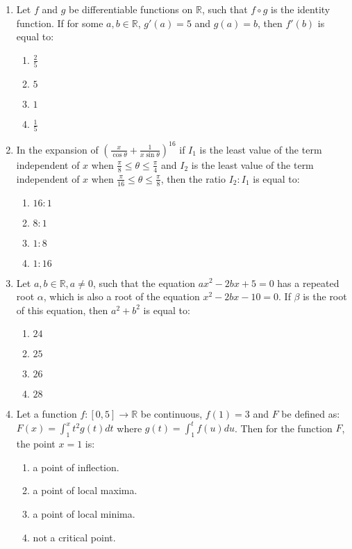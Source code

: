 \documentclass[journal]{IEEEtran}
\begin{document}
\begin{enumerate}
    \item Let $ f $ and $ g $ be differentiable functions on $ \mathbb{R} $, such that $ f \circ g $ is the identity function. If for some $ a, b \in \mathbb{R} $, $ g'(a) = 5 $ and $ g(a) = b $, then $ f'(b) $ is equal to:
        \begin{multicols}{4}
        \begin{enumerate}
            \item $ \frac{2}{5} $  
            \item $ 5 $  
            \item $ 1 $  
            \item $ \frac{1}{5} $
        \end{enumerate}
        \end{multicols}

    \item In the expansion of 
    $ \left( \frac{x}{\cos \theta} + \frac{1}{x \sin \theta} \right)^{16} $
    if $ I_1 $ is the least value of the term independent of $ x $ when $ \frac{\pi}{8} \leq \theta \leq \frac{\pi}{4} $ and $ I_2 $ is the least value of the term independent of $ x $ when $ \frac{\pi}{16} \leq \theta \leq \frac{\pi}{8} $, then the ratio $ I_2 : I_1 $ is equal to:
        \begin{multicols}{4}
        \begin{enumerate}
            \item $ 16:1 $  
            \item $ 8:1 $  
            \item $ 1:8 $  
            \item $ 1:16 $
        \end{enumerate}
        \end{multicols}

    \item Let $ a, b \in \mathbb{R}, a \neq 0 $, such that the equation
    $ ax^2 - 2bx + 5 = 0 $
    has a repeated root $ \alpha $, which is also a root of the equation $ x^2 - 2bx - 10 = 0 $. If $ \beta $ is the root of this equation, then $ a^2 + b^2 $ is equal to:
    \begin{enumerate}
        \item $ 24 $
        \item $ 25 $
        \item $ 26 $
        \item $ 28 $
    \end{enumerate}

    \item Let a function $ f: [0, 5] \rightarrow \mathbb{R} $ be continuous, $ f(1) = 3 $ and $ F $ be defined as:
    $ F(x) = \int_{1}^{x} t^{2} g(t) dt $
    where
    $ g(t) = \int_{1}^{t} f(u) du $.
    Then for the function $ F $, the point $ x = 1 $ is:
    \begin{enumerate}
        \item a point of inflection.
        \item a point of local maxima.
        \item a point of local minima.
        \item not a critical point.
    \end{enumerate}


\end{enumerate}
\end{document}
